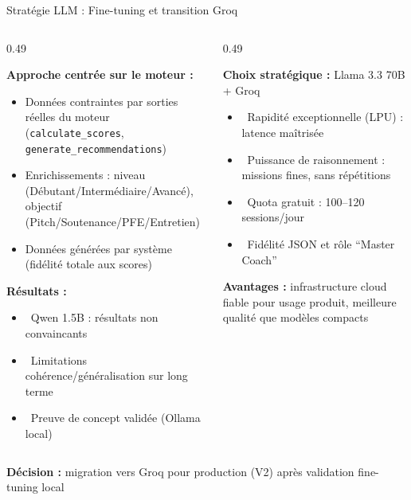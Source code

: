 \documentclass[10pt,aspectratio=169]{beamer}
\newcommand{\cmark}{\textcolor{success}{\ding{51}}}
\newcommand{\xmark}{\textcolor{danger}{\ding{55}}}
\begin{document}
\begin{frame}{Stratégie LLM : Fine-tuning et transition Groq}
\begin{columns}[T]
\begin{column}{0.49\textwidth}
\begin{tcolorbox}[title=Fine-tuning engine-centric, colframe=warning!60!black, colback=warning!8]
\small
\textbf{Approche centrée sur le moteur :}
\begin{itemize}
    \item Données contraintes par sorties réelles du moteur (\texttt{calculate\_scores}, \texttt{generate\_recommendations})
    \item Enrichissements : niveau (Débutant/Intermédiaire/Avancé), objectif (Pitch/Soutenance/PFE/Entretien)
    \item Données générées par système (fidélité totale aux scores)
\end{itemize}
\textbf{Résultats :}
\begin{itemize}
    \item \xmark~Qwen 1.5B : résultats non convaincants
    \item \xmark~Limitations cohérence/généralisation sur long terme
    \item \cmark~Preuve de concept validée (Ollama local)
\end{itemize}
\end{tcolorbox}
\end{column}
\begin{column}{0.49\textwidth}
\begin{tcolorbox}[title=Transition Groq, colframe=success, colback=success!3]
\small
\textbf{Choix stratégique :} Llama 3.3 70B + Groq
\begin{itemize}
    \item \cmark~Rapidité exceptionnelle (LPU) : latence maîtrisée
    \item \cmark~Puissance de raisonnement : missions fines, sans répétitions
    \item \cmark~Quota gratuit : 100--120 sessions/jour
    \item \cmark~Fidélité JSON et rôle ``Master Coach''
\end{itemize}
\textbf{Avantages :} infrastructure cloud fiable pour usage produit, meilleure qualité que modèles compacts
\end{tcolorbox}
\end{column}
\end{columns}
\vspace{0.3cm}
\begin{tcolorbox}[colback=secondary!45,colframe=primary!25]
\small \textbf{Décision :} migration vers Groq pour production (V2) après validation fine-tuning local
\end{tcolorbox}
\end{frame}
\end{document}
